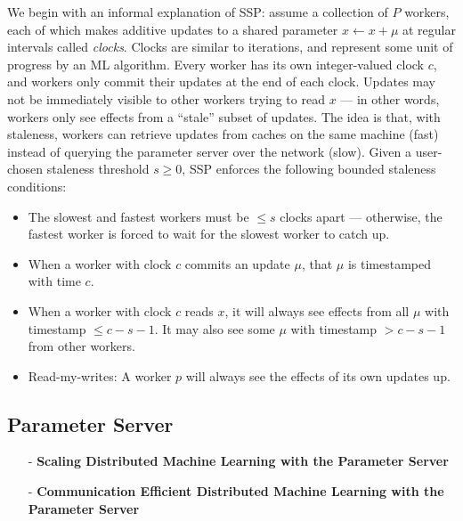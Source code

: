 \begin{newnote}
We begin with an informal explanation of SSP: assume a collection of $P$ workers, each of which makes
additive updates to a shared parameter $x \gets x + \mu$ at regular intervals called \textit{clocks}.
Clocks are similar to iterations, and represent some unit of progress by an ML algorithm. Every worker
has its own integer-valued clock $c$, and workers only commit their updates at the end of each clock.
Updates may not be immediately visible to other workers trying to read $x$ --- in other words, workers
only see effects from a “stale” subset of updates. The idea is that, with staleness, workers can retrieve
updates from caches on the same machine (fast) instead of querying the parameter server over
the network (slow). Given a user-chosen staleness threshold $s \ge 0$, SSP enforces the following
bounded staleness conditions:

\begin{itemize}
	\item The slowest and fastest workers must be $\le s$ clocks apart --- otherwise, the fastest worker
	is forced to wait for the slowest worker to catch up.
	\item When a worker with clock $c$ commits an update $\mu$, that $\mu$ is timestamped with time $c$.
	\item When a worker with clock $c$ reads $x$, it will always see effects from all $\mu$ with timestamp
	$\le c - s - 1$. It may also see some $\mu$ with timestamp $> c - s - 1$ from other workers.
	\item Read-my-writes: A worker $p$ will always see the effects of its own updates up.
\end{itemize}
\end{newnote}


\subsection{Parameter Server}\label{paper:ps-osdi2014}


\begin{itemize}
	\item [-] \textbf{Scaling Distributed Machine Learning with the Parameter Server}
	\item [-] \textbf{Communication Efficient Distributed Machine Learning with the Parameter Server}
\end{itemize}

